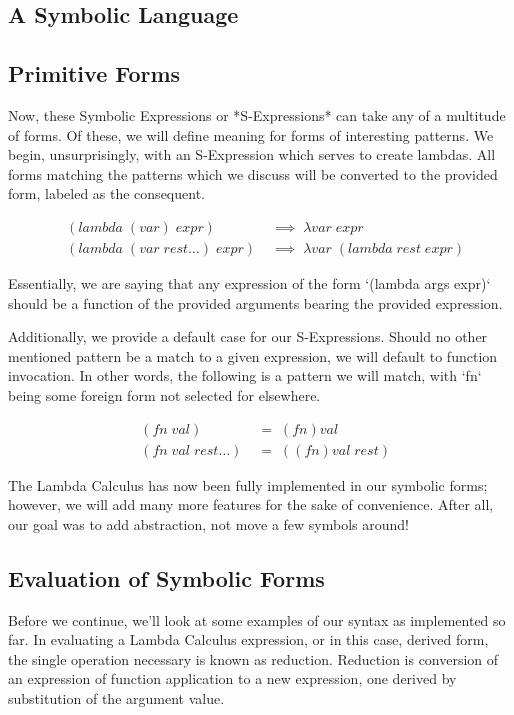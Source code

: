 \documentclass[11pt]{article}
\begin{document}
\subsection{A Symbolic Language}
\subsection{Primitive Forms}
Now, these Symbolic Expressions or *S-Expressions* can take any of a multitude of forms. Of these, we will define meaning for forms of interesting patterns. We begin, unsurprisingly, with an S-Expression which serves to create lambdas. All forms matching the patterns which we discuss will be converted to the provided form, labeled as the consequent.

\begin{align*}
& (lambda \; (var) \; expr) \; &\implies \; \lambda var \; expr
\\& (lambda \; (var \; rest\dots) \; expr) \; &\implies \; \lambda var \; (lambda \; rest \; expr)
\end{align*}

Essentially, we are saying that any expression of the form `(lambda args expr)` should be a function of the provided arguments bearing the provided expression. 

Additionally, we provide a default case for our S-Expressions. Should no other mentioned pattern be a match to a given expression, we will default to function invocation. In other words, the following is a pattern we will match, with `fn` being some foreign form not selected for elsewhere. 

\begin{align*}
& (fn \; val) \; &= \; (fn)val
\\& (fn \; val \; rest\dots) \; &= \; ((fn)val \; rest)
\end{align*}

The Lambda Calculus has now been fully implemented in our symbolic forms; however, we will add many more features for the sake of convenience. After all, our goal was to add abstraction, not move a few symbols around!


\subsection{Evaluation of Symbolic Forms}
Before we continue, we'll look at some examples of our syntax as implemented so far. In evaluating a Lambda Calculus expression, or in this case, derived form, the single operation necessary is known as reduction. Reduction is conversion of an expression of function application to a new expression, one derived by substitution of the argument value.
\end{document}
